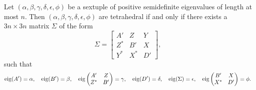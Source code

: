 \documentclass[notitlepage, 10pt]{article}
\begin{document}
\begin{cor}
    \label{cor:tetrahedral_block}
    Let $(\alpha,\beta,\gamma,\delta,\epsilon,\phi)$ be a sextuple of positive semidefinite eigenvalues of length at most $n$.
    Then $(\alpha,\beta,\gamma,\delta,\epsilon,\phi)$ are tetrahedral if and only if there exists a $3n \times 3n$ matrix $\Sigma$ of the form
    \begin{equation}
        \label{eq:block_3by3}
        \Sigma =
        \begin{bmatrix}
            A' & Z & Y \\
            Z^{*} & B' & X\\
            Y^{*} & X^{*} & D'
        \end{bmatrix},
    \end{equation}
    such that
    \begin{equation}
        \label{eq:block_eigenvalue_tet}
        \operatorname{eig}(A') = \alpha, \quad
        \operatorname{eig}(B') = \beta, \quad
        \operatorname{eig}\begin{pmatrix}
            A' & Z \\
            Z^{*} & B'\\
        \end{pmatrix} = \gamma, \quad
        \operatorname{eig}(D') = \delta, \quad
        \operatorname{eig}(\Sigma) = \epsilon, \quad
        \operatorname{eig}
        \begin{pmatrix}
            B' & X \\
            X^{*} & D'
        \end{pmatrix} = \phi.
    \end{equation}
\end{cor}
\end{document}
